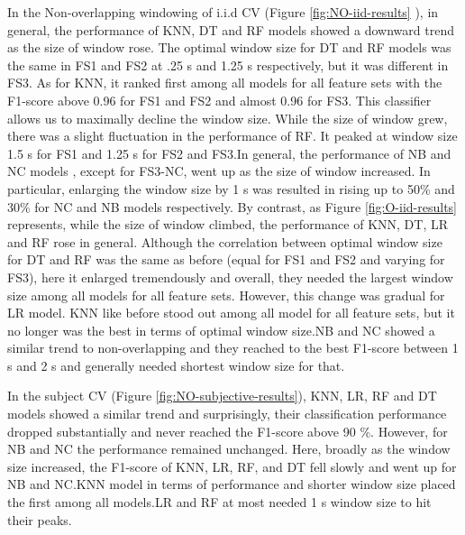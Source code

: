 In the Non-overlapping windowing of i.i.d CV (Figure \ref{fig:NO-iid-results} ), in general, the performance of KNN, DT and RF models showed a downward trend as the size of window rose. The optimal window size for DT and RF models was the same in FS1 and FS2 at .25 s and 1.25 s respectively, but it was different in FS3. As for KNN, it ranked first among all models for all feature sets with the F1-score above 0.96 for FS1 and FS2 and almost 0.96 for FS3. This classifier allows us to maximally decline the window size. While the size of window grew, there was a slight fluctuation in the performance of RF. It peaked at window size 1.5 s for FS1 and 1.25 s for FS2 and FS3.In general, the performance of NB and NC models , except for FS3-NC, went up as the size of window increased. In particular, enlarging the window size by 1 s was resulted in rising up to 50\% and 30\% for NC and NB models respectively.
 \newline
By contrast, as Figure \ref{fig:O-iid-results} represents, while the size of window climbed, the performance of KNN, DT, LR and RF rose in general. Although the correlation between optimal window size for DT and RF was the same as before (equal for FS1 and FS2 and varying for FS3), here it enlarged tremendously and overall, they needed the largest window size among all models for all feature sets. However, this change was gradual for LR model. KNN like before stood out among all model for all feature sets, but it no longer was the best in terms of optimal window size.NB and NC showed a similar trend to non-overlapping and they reached to the best F1-score between 1 s and 2 s and generally needed shortest window size for that.\newline

In the subject CV (Figure \ref{fig:NO-subjective-results}), KNN, LR, RF and DT models showed a similar trend and surprisingly, their classification performance dropped substantially and never reached the F1-score above 90 \%. However, for NB and NC the performance remained unchanged. Here, broadly as the window size increased, the F1-score of KNN, LR, RF, and DT fell slowly and went up for NB and NC.KNN model in terms of performance and shorter window size placed the first among all models.LR and RF at most needed 1 s window size to hit their peaks.



